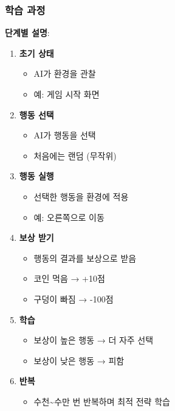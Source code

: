 \documentclass[a4paper, 11pt]{article}
\providecommand{\tightlist}{%
  \setlength{\itemsep}{0pt}\setlength{\parskip}{0pt}}
\begin{document}
\hypertarget{uxd559uxc2b5-uxacfcuxc815}{%
\subsubsection{학습 과정}\label{uxd559uxc2b5-uxacfcuxc815}}

\textbf{단계별 설명}:

\begin{enumerate}
\def\labelenumi{\arabic{enumi}.}
\tightlist
\item
  \textbf{초기 상태}

  \begin{itemize}
  \tightlist
  \item
    AI가 환경을 관찰
  \item
    예: 게임 시작 화면
  \end{itemize}
\item
  \textbf{행동 선택}

  \begin{itemize}
  \tightlist
  \item
    AI가 행동을 선택
  \item
    처음에는 랜덤 (무작위)
  \end{itemize}
\item
  \textbf{행동 실행}

  \begin{itemize}
  \tightlist
  \item
    선택한 행동을 환경에 적용
  \item
    예: 오른쪽으로 이동
  \end{itemize}
\item
  \textbf{보상 받기}

  \begin{itemize}
  \tightlist
  \item
    행동의 결과를 보상으로 받음
  \item
    코인 먹음 → +10점
  \item
    구덩이 빠짐 → -100점
  \end{itemize}
\item
  \textbf{학습}

  \begin{itemize}
  \tightlist
  \item
    보상이 높은 행동 → 더 자주 선택
  \item
    보상이 낮은 행동 → 피함
  \end{itemize}
\item
  \textbf{반복}

  \begin{itemize}
  \tightlist
  \item
    수천\textasciitilde 수만 번 반복하며 최적 전략 학습
  \end{itemize}
\end{enumerate}
\end{document}
